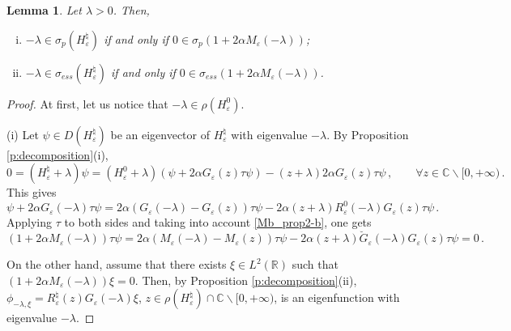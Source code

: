 \documentclass[a4paper,11pt,reqno]{amsart}
\newtheorem{lemma}[theorem]{Lemma}
\theoremstyle{definition}
\numberwithin{equation}{section}
\newcommand{\CO}{\mathbb C}
\newcommand{\RE}{\mathbb R}
\newcommand{\ve}{\varepsilon}
\newcommand{\bosfer}{{\natural}}
\begin{document}
\begin{lemma}\label{l:spectrum} Let $\lambda > 0$. Then,
\begin{enumerate}[(i)]
    \item $-\lambda \in \sigma_{p}(H^\bosfer_\ve) $ if and only if $0  \in \sigma_{p}(1  +2\alpha M_{\ve}(-\lambda))$;
    \item $-\lambda \in \sigma_{ess}(H^\bosfer_\ve) $ if and only if $0  \in \sigma_{ess}(1  +2\alpha M_\ve(-\lambda))$.
\end{enumerate}
\end{lemma}
\begin{proof}   
At first, let us notice that $-\lambda \in \rho (H^{0}_{\ve})$. 

(i) Let $\psi\in D(H^\bosfer_\ve)$ be an eigenvector of $H^\bosfer_\ve$ with eigenvalue $-\lambda$. 
By Proposition \ref{p:decomposition}(i),
\[0 =(H^\bosfer_\ve +\lambda ) \psi = (H^{0}_{\ve} +\lambda) (\psi+2\alpha G_{\ve}(z)\tau\psi)
 - (z+\lambda) 2\alpha G_{\ve}(z)\tau\psi\,,\qquad\forall z\in\CO\backslash[0,+\infty)\,.
\]
This gives
\[
 \psi+2\alpha G_{\ve}(-\lambda)\tau\psi =2\alpha(G_{\ve}(-\lambda)-G_{\ve}(z))\tau\psi - 2\alpha(z+\lambda)R^{0}_{\ve}(-\lambda)G_{\ve}(z)\tau\psi\,. 
\]
Applying $\tau$ to both sides and taking into account \eqref{Mb_prop2-b}, one gets
\[
(1+2\alpha M_{\ve}(-\lambda))\tau\psi=2\alpha  (M_{\ve}(-\lambda)-M_{\ve}(z))\tau\psi-2\alpha(z+\lambda)\breve G_{\ve}(-\lambda)G_{\ve}(z)\tau\psi=0\,.
\]

On the other hand, assume that there exists $\xi \in  L^2(\RE)$ such that $(1  + 2\alpha M_{\ve}(-\lambda))\xi =0$. Then, by Proposition \ref{p:decomposition}(ii), $\phi_{-\lambda,\xi}=R^{\bosfer}_{\ve}(z)G_{\ve}(-\lambda)\xi$, $z\in  \rho(H^\bosfer_\ve)\cap \CO\backslash[0,+\infty)$, is an eigenfunction with eigenvalue $-\lambda$.


\end{proof}
\end{document}
